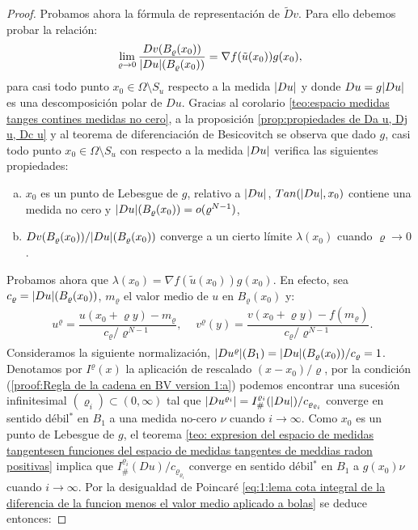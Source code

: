 \documentclass[a4paper,11pt,spanish, twoside, leqno]{tfm-uam}
\begin{document}
\begin{proof}
Probamos ahora la fórmula de representación de $\tilde{D}v$. Para ello debemos probar la relación:
\begin{align*}
\lim_{\varrho\to 0}\dfrac{Dv(B_{\varrho}(x_{0}))}{\lvert Du\rvert(B_{\varrho}(x_{0}))}=\nabla f(\tilde{u}(x_{0}))g(x_{0}),
\end{align*}
para casi todo punto $x_{0}\in \Omega\setminus S_{u}$ respecto a la medida $\lvert Du\rvert$ y donde $Du=g\lvert Du\rvert$ es una descomposición polar de $Du$. Gracias al corolario \ref{teo:espacio medidas tanges contines medidas no cero}, a la proposición \ref{prop:propiedades de Da u, Dj u, Dc u} y al teorema de diferenciación de Besicovitch se observa que dado $g$, casi todo punto $x_{0}\in \Omega\setminus S_{u}$ con respecto a la medida $\lvert Du\rvert$ verifica las siguientes propiedades:
\begin{enumerate}[(a)]
\item $x_{0}$ es un punto de Lebesgue de $g$, relativo a $\lvert Du\rvert$, $Tan(\lvert Du\rvert,x_{0})$ contiene una medida no cero y $\lvert Du\rvert(B_{\varrho}(x_{0}))=o(\varrho^{N-1})$,\label{proof:Regla de la cadena en BV version 1:a}
\item $Dv(B_{\varrho}(x_{0}))/\lvert Du\rvert(B_{\varrho}(x_{0}))$ converge a un cierto límite $\lambda(x_{0})$ cuando $\varrho\to 0$.\label{proof:Regla de la cadena en BV version 1:b}
\end{enumerate}
Probamos ahora que $\lambda(x_{0})=\nabla{f(\tilde{u}(x_{0}))}g(x_{0})$. En efecto, sea $c_{\varrho}=\lvert Du\rvert(B_{\varrho}(x_{0}))$, $m_{\varrho}$ el valor medio de $u$ en $B_{\varrho}(x_{0})$ y:
\begin{align*}
\begin{array}{ll}
u^{\varrho}=\dfrac{u(x_{0}+\varrho y)-m_{\varrho}}{c_{\varrho}/\varrho^{N-1}},
\end{array} & v^{\varrho}(y)=\dfrac{v(x_{0}+\varrho y)-f(m_{\varrho})}{c_{\varrho}/\varrho^{N-1}}.
\end{align*}
Consideramos la siguiente normalización, $\lvert Du^{\varrho}\rvert(B_1)=\lvert Du\rvert(B_{\varrho}(x_{0}))/c_{\varrho}=1$. Denotamos por $I^{\varrho}(x)$ la aplicación de rescalado $(x-x_{0})/\varrho$, por la condición (\ref{proof:Regla de la cadena en BV version 1:a}) podemos encontrar una sucesión infinitesimal $(\varrho_{i})\subset (0,\infty)$ tal que $\lvert Du^{\varrho_{i}}\rvert=I_{\#}^{\varrho_{i}}(\lvert Du\rvert)/c_{\varrho_{\varrho_{i}}}$ converge en sentido débil$^{*}$ en $B_1$ a una medida no-cero $\nu$ cuando $i\to \infty$. Como $x_{0}$ es un punto de Lebesgue de $g$, el teorema \ref{teo: expresion del espacio de medidas tangentesen funciones del espacio de medidas tangentes de meddias radon positivas} implica que $I_{\#}^{\varrho_{i}}(Du)/c_{\varrho_{\varrho_{i}}}$ converge en sentido débil$^{*}$ en $B_1$ a $g(x_0)\nu$ cuando $i\to \infty$. Por la desigualdad de Poincaré \ref{eq:1:lema cota integral de la diferencia de la funcion menos el valor medio aplicado a bolas} se deduce entonces:

\end{proof}
\end{document}
